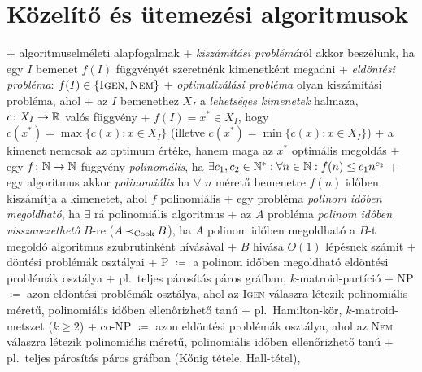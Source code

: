 \section{Közelítő és ütemezési algoritmusok} 


+ algoritmuselméleti alapfogalmak
  + \dfn \emph{kiszámítási problémá}ról akkor beszélünk, ha egy $I$
    bemenet $f(I)$ függvényét szeretnénk kimenetként megadni
    + \emph{eldöntési probléma}: $f(I) \in \{\textsc{Igen},
      \textsc{Nem}\}$
  + \dfn \emph{optimalizálási probléma} olyan kiszámítási probléma, ahol
    + az $I$ bemenethez $X_I$ a \emph{lehetséges kimenetek} halmaza,
      $c\colon X_I \to \mathbb{R}$ valós függvény
    + $f(I) = x^* \in X_I$, hogy $c(x^*) = \max \{ c(x) : x \in X_I \}$
      (illetve $c(x^*) = \min \{ c(x) : x \in X_I \}$)
    + a kimenet nemcsak az optimum értéke, hanem maga az $x^*$ optimális
      megoldás
  + \dfn egy $f \colon \mathbb{N} \to \mathbb{N}$ függvény \emph{polinomális}, ha
    $\exists c_1, c_2 \in \mathbb{N}^*: \forall n \in \mathbb{N} : f(n) \le c_1
    n^{c_2}$
    + egy algoritmus akkor \emph{polinomiális} ha $\forall$ $n$ méretű
      bemenetre $f(n)$ időben kiszámítja a kimenetet, ahol $f$
      polinomiális
    + egy probléma \emph{polinom időben megoldható}, ha $\exists$ rá
      polinomiális algoritmus
  + \dfn az $A$ probléma \emph{polinom időben visszavezethető} $B$-re
    ($A \mathbin{{\prec}_{\textrm{Cook}}} B$), ha $A$ polinom időben megoldható a
    $B$-t megoldó algoritmus szubrutinként hívásával
    + $B$ hivása $O(1)$ lépésnek számit
  + \dfn döntési problémák osztályai
    + P $\coloneqq$ a polinom időben megoldható eldöntési
      problémák osztálya
      + pl.~teljes párosítás páros gráfban, $k$-matroid-partíció
    + NP $\coloneqq$ azon eldöntési problémák osztálya, ahol az
      \textsc{Igen} válaszra létezik polinomiális méretű, polinomiális
      időben ellenőrizhető tanú
      + pl.~Hamilton-kör, $k$-matroid-metszet ($k \ge 2$)
    + co-NP $\coloneqq$ azon eldöntési problémák osztálya, ahol az
      \textsc{Nem} válaszra létezik polinomiális méretű, polinomiális
      időben ellenőrizhető tanú
      + pl.~teljes párosítás páros gráfban (Kőnig tétele, Hall-tétel),

